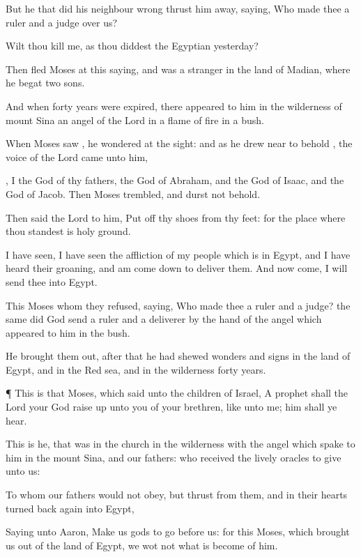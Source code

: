 {But he that
did his
neighbour
wrong
thrust
him
away,
saying,
Who
made
thee a
ruler
and a
judge
over
us?

Wilt
thou
kill
me,
as
thou
diddest the
Egyptian
yesterday?

Then
fled
Moses
at
this
saying,
and
was a
stranger
in the
land of
Madian,
where he
begat
two
sons.

And
when
forty
years were
expired, there
appeared to
him
in the
wilderness of
mount
Sina an
angel of the
Lord
in a
flame of
fire in a
bush.

When
Moses
saw
{}, he
wondered at the
sight:
and as he drew
near to
behold
{}, the
voice of the
Lord
came
unto
him,

,
I
{} the
God
of
thy
fathers, the
God of
Abraham,
and the
God of
Isaac,
and the
God of
Jacob.
Then
Moses
trembled, and
durst
not
behold.

Then
said the
Lord to
him, Put
off
thy
shoes
from
thy
feet:
for the
place
where thou
standest
is
holy
ground.

I have
seen, I have
seen the
affliction
of
my
people
which is
in
Egypt,
and I have
heard
their
groaning,
and am come
down to
deliver
them.
And
now
come, I will
send
thee
into
Egypt.

This
Moses
whom they
refused,
saying,
Who
made
thee a
ruler
and a
judge? the
same
did
God
send
{} a
ruler
and a
deliverer
by the
hand of the
angel
which
appeared to
him
in the
bush.

He
brought
them
out, after that he had
shewed
wonders
and
signs
in the
land of
Egypt,
and
in
the Red
sea,
and
in the
wilderness
forty
years.


\par }{\PP {}¶
This
is
that
Moses, which
said unto the
children of
Israel, A
prophet
shall the
Lord
your
God raise
up unto
you
of
your
brethren,
like unto
me;
him shall ye
hear.

This
is he, that
was
in the
church
in the
wilderness
with the
angel
which
spake to
him
in the
mount
Sina,
and
{}
our
fathers:
who
received the
lively
oracles to
give unto
us:

To
whom
our
fathers
would
not
obey,
but
thrust
{} from
them,
and
in
their
hearts turned back
again
into
Egypt,

Saying unto
Aaron,
Make
us
gods
to go
before
us:
for
{}
this
Moses,
which
brought
us
out
of the
land of
Egypt, we
wot
not
what is
become of
him.

}

